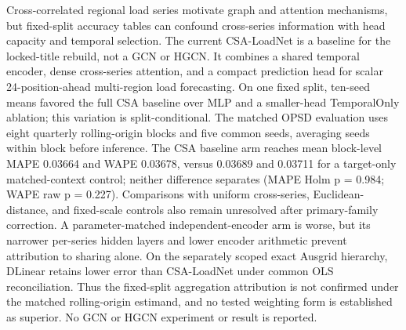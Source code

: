 Cross-correlated regional load series motivate graph and attention mechanisms, but fixed-split accuracy tables can confound cross-series information with head capacity and temporal selection. The current CSA-LoadNet is a baseline for the locked-title rebuild, not a GCN or HGCN. It combines a shared temporal encoder, dense cross-series attention, and a compact prediction head for scalar 24-position-ahead multi-region load forecasting. On one fixed split, ten-seed means favored the full CSA baseline over MLP and a smaller-head TemporalOnly ablation; this variation is split-conditional. The matched OPSD evaluation uses eight quarterly rolling-origin blocks and five common seeds, averaging seeds within block before inference. The CSA baseline arm reaches mean block-level MAPE 0.03664 and WAPE 0.03678, versus 0.03689 and 0.03711 for a target-only matched-context control; neither difference separates (MAPE Holm p = 0.984; WAPE raw p = 0.227). Comparisons with uniform cross-series, Euclidean-distance, and fixed-scale controls also remain unresolved after primary-family correction. A parameter-matched independent-encoder arm is worse, but its narrower per-series hidden layers and lower encoder arithmetic prevent attribution to sharing alone. On the separately scoped exact Ausgrid hierarchy, DLinear retains lower error than CSA-LoadNet under common OLS reconciliation. Thus the fixed-split aggregation attribution is not confirmed under the matched rolling-origin estimand, and no tested weighting form is established as superior. No GCN or HGCN experiment or result is reported.
